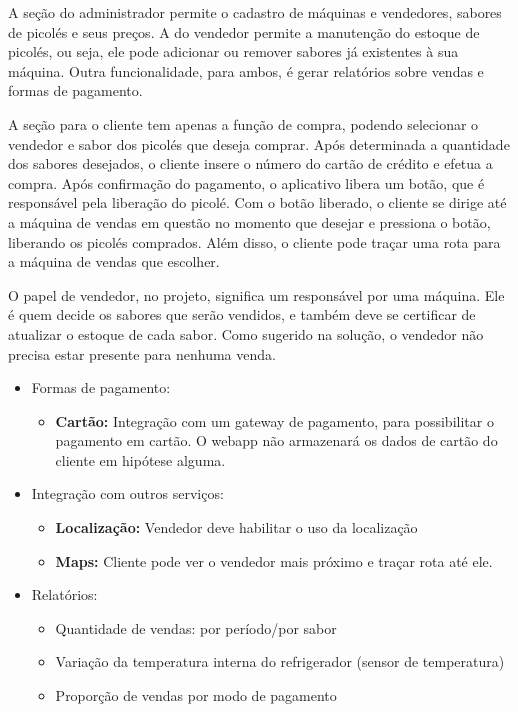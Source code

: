 A seção do administrador permite o cadastro de máquinas e vendedores, sabores de picolés e seus preços. A do vendedor permite a manutenção do estoque de picolés, ou seja, ele pode adicionar ou remover sabores já existentes à sua máquina. Outra funcionalidade, para ambos, é gerar relatórios sobre vendas e formas de pagamento.

A seção para o cliente tem apenas a função de compra, podendo selecionar o vendedor e sabor dos picolés que deseja comprar. Após determinada a quantidade dos sabores desejados, o cliente insere o número do cartão de crédito e efetua a compra. Após confirmação do pagamento, o aplicativo libera um botão, que é responsável pela liberação do picolé. Com o botão liberado, o cliente se dirige até a máquina de vendas em questão no momento que desejar e pressiona o botão, liberando os picolés comprados. Além disso, o cliente pode traçar uma rota para a máquina de vendas que escolher.

O papel de vendedor, no projeto, significa um responsável por uma máquina. Ele é quem decide os sabores que serão vendidos, e também deve se certificar de atualizar o estoque de cada sabor. Como sugerido na solução, o vendedor não precisa estar presente para nenhuma venda.

\begin{itemize}
	\item Formas de pagamento:
    \begin{itemize}
        \item \textbf{Cartão:} Integração com um gateway de pagamento, para possibilitar o pagamento em cartão. O webapp não armazenará os dados de cartão do cliente em hipótese alguma.
  	\end{itemize}

	\item Integração com outros serviços:
  	\begin{itemize}
    	\item \textbf{Localização:} Vendedor deve habilitar o uso da localização
    	\item \textbf{Maps:} Cliente pode ver o vendedor mais próximo e traçar rota até ele.
  	\end{itemize}

	\item Relatórios:
  	\begin{itemize}
        \item Quantidade de vendas: por período/por sabor
        \item Variação da temperatura interna do refrigerador (sensor de temperatura)
        \item Proporção de vendas por modo de pagamento
  	\end{itemize}
\end{itemize}

